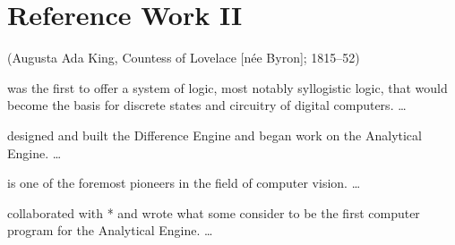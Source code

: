 \documentclass[oneside]{article}
\begin{document}
%
%

\section{Reference Work II}

\newif\ifHeadword
\newif\ifAncientName


 { (Augusta Ada King, Countess of Lovelace
   [née Byron]; 1815--52)}

\makeatletter
\renewcommand\NamesFormat[1]
{%
  \ifHeadword
    \ifNameauthWestern
      \@nameauth@RevThisCommatrue%
      \bfseries \NameParser%
      \normalfont\NameQueryInfo{}%
    \else
      \begingroup%
        \bfseries \NameParser%
        \unless\ifAncientName
          \normalfont; W:\AltOff\space
          \@nameauth@RevThistrue \NameParser%
        \fi
        \normalfont\NameQueryInfo{}%
      \endgroup%
    \fi
  \else
    \NameParser%
  \fi
  \global\Headwordfalse%
  \global\AncientNamefalse%
}
\makeatother
\renewcommand\MainNameHook{\AltOff}

\newcommand\Headword{\Headwordtrue\ForgetThis}
\renewcommand{\RefArticle}[2]
{%
  \noindent\Headword #1 #2
  \medskip
}

\RefArticle{\AncientNametrue{}}{was the first to offer
a system of logic, most notably syllogistic logic, that would
become the basis for discrete states and circuitry of
digital computers. \Name{Aristotle}\dots}

\RefArticle{}{designed and
built the Difference Engine and began work on the Analytical
Engine. \Name[Charles]{\noexpand\textBF{Babbage}}\dots}

\RefArticle{}{is one of the
foremost pioneers in the field of computer vision.
\Name{\noexpand\textUC{Kanade}, Takeo}\dots}

\RefArticle{}{collaborated with
\Name*[Charles]{\noexpand\textBF{Babbage}}* and wrote what some
consider to be the first computer program for the Analytical
Engine. \Name[Ada]{\noexpand\textIT{Lovelace}}\dots}
\end{document}

